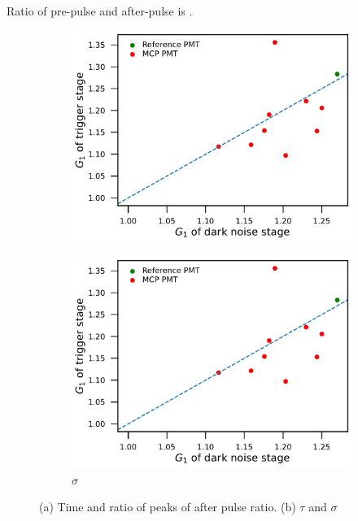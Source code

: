 Ratio of pre-pulse and after-pulse is .
\begin{figure}[!htbp]
    \centering
    \begin{subfigure}[b]{0.49\textwidth}
        \includegraphics[width=\textwidth,page=14]{figures/result/compare.pdf}
        \caption{}
        \label{fig:afterpulsePeak}
    \end{subfigure}
    \begin{subfigure}[b]{0.49\textwidth}
        \includegraphics[width=\textwidth,page=13]{figures/result/compare.pdf}
        \caption{$\sigma$}
        \label{fig:sigmaCompare}
    \end{subfigure}
    \caption{(a) Time and ratio of peaks of after pulse ratio. (b) $\tau$ and $\sigma$}
\end{figure}

